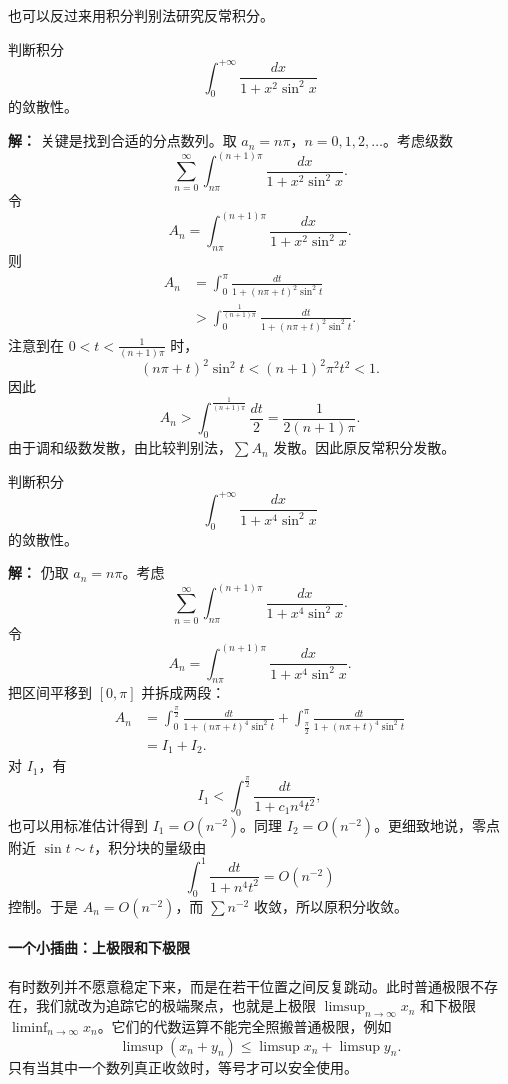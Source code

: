 也可以反过来用积分判别法研究反常积分。

\begin{example}
判断积分
\[
    \int_0^{+\infty}\frac{dx}{1+x^2\sin^2x}
\]
的敛散性。

\textbf{解：} 关键是找到合适的分点数列。取 $a_n=n\pi$，$n=0,1,2,\dots$。考虑级数
\[
    \sum_{n=0}^{\infty}\int_{n\pi}^{(n+1)\pi}\frac{dx}{1+x^2\sin^2x}.
\]
令
\[
    A_n=\int_{n\pi}^{(n+1)\pi}\frac{dx}{1+x^2\sin^2x}.
\]
则
\[
\begin{aligned}
A_n
&=\int_0^{\pi}\frac{dt}{1+(n\pi+t)^2\sin^2t}  \\
&>\int_0^{\frac{1}{(n+1)\pi}}\frac{dt}{1+(n\pi+t)^2\sin^2t}.
\end{aligned}
\]
注意到在 $0<t<\frac{1}{(n+1)\pi}$ 时，
\[
    (n\pi+t)^2\sin^2t<(n+1)^2\pi^2t^2<1.
\]
因此
\[
    A_n>\int_0^{\frac{1}{(n+1)\pi}}\frac{dt}{2}
    =\frac{1}{2(n+1)\pi}.
\]
由于调和级数发散，由比较判别法，$\sum A_n$ 发散。因此原反常积分发散。
\end{example}

\begin{example}
判断积分
\[
    \int_0^{+\infty}\frac{dx}{1+x^4\sin^2x}
\]
的敛散性。

\textbf{解：} 仍取 $a_n=n\pi$。考虑
\[
    \sum_{n=0}^{\infty}\int_{n\pi}^{(n+1)\pi}\frac{dx}{1+x^4\sin^2x}.
\]
令
\[
    A_n=\int_{n\pi}^{(n+1)\pi}\frac{dx}{1+x^4\sin^2x}.
\]
把区间平移到 $[0,\pi]$ 并拆成两段：
\[
\begin{aligned}
A_n
&=\int_0^{\frac{\pi}{2}}\frac{dt}{1+(n\pi+t)^4\sin^2t}
 +\int_{\frac{\pi}{2}}^{\pi}\frac{dt}{1+(n\pi+t)^4\sin^2t}  \\
&=I_1+I_2.
\end{aligned}
\]
对 $I_1$，有
\[
I_1<\int_0^{\frac{\pi}{2}}\frac{dt}{1+c_1 n^4 t^2},
\]
也可以用标准估计得到 $I_1=O(n^{-2})$。同理 $I_2=O(n^{-2})$。更细致地说，零点附近 $\sin t\sim t$，积分块的量级由
\[
    \int_0^1\frac{dt}{1+n^4t^2}=O(n^{-2})
\]
控制。于是 $A_n=O(n^{-2})$，而 $\sum n^{-2}$ 收敛，所以原积分收敛。
\end{example}

\paragraph{一个小插曲：上极限和下极限}

有时数列并不愿意稳定下来，而是在若干位置之间反复跳动。此时普通极限不存在，我们就改为追踪它的极端聚点，也就是上极限 $\limsup_{n\to\infty}x_n$ 和下极限 $\liminf_{n\to\infty}x_n$。它们的代数运算不能完全照搬普通极限，例如
\[
    \limsup(x_n+y_n)\leq \limsup x_n+\limsup y_n.
\]
只有当其中一个数列真正收敛时，等号才可以安全使用。

